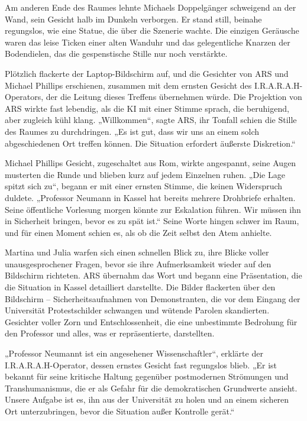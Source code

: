\documentclass[
]{article}
\begin{document}
Am anderen Ende des Raumes lehnte Michaels Doppelgänger schweigend an
der Wand, sein Gesicht halb im Dunkeln verborgen. Er stand still,
beinahe regungslos, wie eine Statue, die über die Szenerie wachte. Die
einzigen Geräusche waren das leise Ticken einer alten Wanduhr und das
gelegentliche Knarzen der Bodendielen, das die gespenstische Stille nur
noch verstärkte.

Plötzlich flackerte der Laptop-Bildschirm auf, und die Gesichter von ARS
und Michael Phillips erschienen, zusammen mit dem ernsten Gesicht des
I.R.A.R.A.H-Operators, der die Leitung dieses Treffens übernehmen würde.
Die Projektion von ARS wirkte fast lebendig, als die KI mit einer Stimme
sprach, die beruhigend, aber zugleich kühl klang. „Willkommen``, sagte
ARS, ihr Tonfall schien die Stille des Raumes zu durchdringen. „Es ist
gut, dass wir uns an einem solch abgeschiedenen Ort treffen können. Die
Situation erfordert äußerste Diskretion.``

Michael Phillips\textquotesingle{} Gesicht, zugeschaltet aus Rom, wirkte
angespannt, seine Augen musterten die Runde und blieben kurz auf jedem
Einzelnen ruhen. „Die Lage spitzt sich zu``, begann er mit einer ernsten
Stimme, die keinen Widerspruch duldete. „Professor Neumann in Kassel hat
bereits mehrere Drohbriefe erhalten. Seine öffentliche Vorlesung morgen
könnte zur Eskalation führen. Wir müssen ihn in Sicherheit bringen,
bevor es zu spät ist.`` Seine Worte hingen schwer im Raum, und für einen
Moment schien es, als ob die Zeit selbst den Atem anhielte.

Martina und Julia warfen sich einen schnellen Blick zu, ihre Blicke
voller unausgesprochener Fragen, bevor sie ihre Aufmerksamkeit wieder
auf den Bildschirm richteten. ARS übernahm das Wort und begann eine
Präsentation, die die Situation in Kassel detailliert darstellte. Die
Bilder flackerten über den Bildschirm -- Sicherheitsaufnahmen von
Demonstranten, die vor dem Eingang der Universität Protestschilder
schwangen und wütende Parolen skandierten. Gesichter voller Zorn und
Entschlossenheit, die eine unbestimmte Bedrohung für den Professor und
alles, was er repräsentierte, darstellten.

„Professor Neumannt ist ein angesehener Wissenschaftler``, erklärte der
I.R.A.R.A.H-Operator, dessen ernstes Gesicht fast regungslos blieb. „Er
ist bekannt für seine kritische Haltung gegenüber postmodernen
Strömungen und Transhumanismus, die er als Gefahr für die demokratischen
Grundwerte ansieht. Unsere Aufgabe ist es, ihn aus der Universität zu
holen und an einem sicheren Ort unterzubringen, bevor die Situation
außer Kontrolle gerät.``
\end{document}
